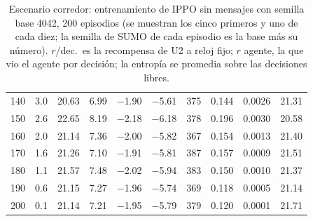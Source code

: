 \begin{table}[H]
\begin{tabular}{rrrrrrrrrr}
140 & 3.0 & 20.63 & 6.99 & $-$1.90 & $-$5.61 & 375 & 0.144 & 0.0026 & 21.31 \\
150 & 2.6 & 22.65 & 8.19 & $-$2.18 & $-$6.18 & 378 & 0.196 & 0.0030 & 20.58 \\
160 & 2.0 & 21.14 & 7.36 & $-$2.00 & $-$5.82 & 367 & 0.154 & 0.0013 & 21.40 \\
170 & 1.6 & 21.26 & 7.10 & $-$1.91 & $-$5.81 & 387 & 0.157 & 0.0009 & 21.51 \\
180 & 1.1 & 21.57 & 7.48 & $-$2.02 & $-$5.94 & 383 & 0.150 & 0.0010 & 21.37 \\
190 & 0.6 & 21.15 & 7.27 & $-$1.96 & $-$5.74 & 369 & 0.118 & 0.0005 & 21.14 \\
200 & 0.1 & 21.14 & 7.21 & $-$1.95 & $-$5.79 & 379 & 0.120 & 0.0001 & 21.71 \\
\bottomrule
\end{tabular}
\caption[Escenario corredor: entrenamiento de IPPO sin mensajes, semilla base 4042]{Escenario corredor: entrenamiento de IPPO sin mensajes con semilla base 4042, 200 episodios (se muestran los cinco primeros y uno de cada diez; la semilla de SUMO de cada episodio es la base más su número). $r$/dec.\ es la recompensa de U2 a reloj fijo; $r$ agente, la que vio el agente por decisión; la entropía se promedia sobre las decisiones libres.}
\label{tab:corredor-ippo-local-4042}
\end{table}


